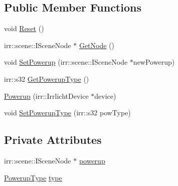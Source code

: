 \subsection*{Public Member Functions}
\begin{DoxyCompactItemize}
\item 
void \hyperlink{class_powerup_a7b05c90e271c1a81f3a7c8f3bf4c34fd}{Reset} ()
\item 
irr\-::scene\-::\-I\-Scene\-Node $\ast$ \hyperlink{class_powerup_a8215d4def5425ffd3e87b137e16a02e0}{Get\-Node} ()
\item 
void \hyperlink{class_powerup_a83662c82e6c9c2192713f37e93da7867}{Set\-Powerup} (irr\-::scene\-::\-I\-Scene\-Node $\ast$new\-Powerup)
\item 
irr\-::s32 \hyperlink{class_powerup_ada850ff17171453b95547a93700e923b}{Get\-Powerup\-Type} ()
\item 
\hyperlink{class_powerup_aa43da0d7fcdecf970c2206120474c84d}{Powerup} (irr\-::\-Irrlicht\-Device $\ast$device)
\item 
void \hyperlink{class_powerup_ad37083facb3025fa933d851ea8ecd549}{Set\-Powerup\-Type} (irr\-::s32 pow\-Type)
\end{DoxyCompactItemize}
\subsection*{Private Attributes}
\begin{DoxyCompactItemize}
\item 
irr\-::scene\-::\-I\-Scene\-Node $\ast$ \hyperlink{class_powerup_a45107cde4eb55f37b7c3b21c3bf1c156}{powerup}
\item 
\hyperlink{class_powerup_aaaae31c2cf5971eca7bd676279a5b468}{Powerup\-Type} \hyperlink{class_powerup_addc7f76821bf2505d35b85d3cf725a16}{type}
\end{DoxyCompactItemize}


